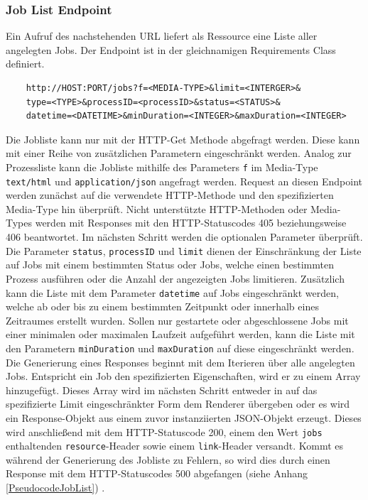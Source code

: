 \subsubsection{Job List Endpoint}
Ein Aufruf des nachstehenden URL liefert als Ressource eine Liste aller angelegten Jobs. Der Endpoint ist in der gleichnamigen Requirements Class definiert.
\begin{center}
\begin{BVerbatim}
    http://HOST:PORT/jobs?f=<MEDIA-TYPE>&limit=<INTERGER>&
    type=<TYPE>&processID=<processID>&status=<STATUS>&
    datetime=<DATETIME>&minDuration=<INTEGER>&maxDuration=<INTEGER>
\end{BVerbatim}
\end{center}
Die Jobliste kann nur mit der HTTP-Get Methode abgefragt werden.
Diese kann mit einer Reihe von zusätzlichen Parametern eingeschränkt werden. 
Analog zur Prozessliste kann die Jobliste mithilfe des Parameters \verb|f| im Media-Type \verb|text/html|
und \verb|application/json| angefragt werden. 
Request an diesen Endpoint werden zunächst auf die verwendete HTTP-Methode und den spezifizierten Media-Type hin 
überprüft. Nicht unterstützte HTTP-Methoden oder Media-Types werden mit Responses mit den HTTP-Statuscodes 405 beziehungsweise 406 beantwortet. 
Im nächsten Schritt werden die optionalen Parameter überprüft. 
Die Parameter \verb|status|, \verb|processID| und \verb|limit| dienen der Einschränkung der Liste auf Jobs mit einem bestimmten Status oder Jobs, welche 
einen bestimmten Prozess ausführen oder die Anzahl der angezeigten Jobs limitieren. Zusätzlich kann die Liste mit dem Parameter \verb|datetime|
auf Jobs eingeschränkt werden, welche ab oder 
bis zu einem bestimmten Zeitpunkt oder innerhalb eines Zeitraumes erstellt wurden. Sollen nur gestartete oder abgeschlossene Jobs mit einer minimalen oder maximalen Laufzeit  
aufgeführt werden, kann die Liste mit den Parametern \verb|minDuration| und \verb|maxDuration| auf diese eingeschränkt werden.
Die Generierung eines Responses beginnt mit dem Iterieren über alle angelegten Jobs. Entspricht ein Job den spezifizierten Eigenschaften, wird er zu einem 
Array hinzugefügt. Dieses Array wird im nächsten Schritt entweder in auf das spezifizierte Limit eingeschränkter Form dem Renderer übergeben oder es wird 
ein Response-Objekt aus einem zuvor instanziierten JSON-Objekt erzeugt. Dieses wird anschließend mit dem HTTP-Statuscode 200, einem den Wert \verb|jobs| enthaltenden 
\verb|resource|-Header sowie einem \verb|link|-Header versandt. 
Kommt es während der Generierung des Jobliste zu Fehlern, so wird dies durch einen Response mit dem HTTP-Statuscodes 500 abgefangen
(siehe Anhang \ref{PseudocodeJobList}) \cite{code,ogc_api_processes_core}. 


